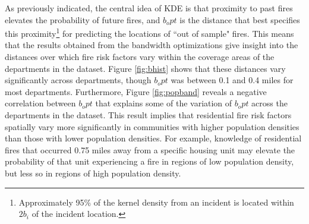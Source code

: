 \documentclass{svjour3}
\begin{document}
 As previously indicated, the central idea of KDE is that proximity to past fires elevates the probability of future fires, and $b_opt$ is the distance that best specifies this proximity\footnote{Approximately 95\% of the kernel density from an incident is located within $2b_i$ of the incident location.} for predicting the locations of ``out of sample" fires. This means that the results obtained from the bandwidth optimizations give insight into the distances over which fire risk factors vary within the coverage areas of the departments in the dataset. Figure \ref{fig:bhist} shows that these distances vary significantly across departments, though $b_opt$ was between 0.1 and 0.4 miles for most departments. Furthermore, Figure \ref{fig:popband} reveals a negative correlation between $b_opt$ that explains some of the variation of $b_opt$ across the departments in the dataset. This result implies that residential fire risk factors spatially vary more significantly in communities with higher population densities than those with lower population densities. For example, knowledge of residential fires that occurred 0.75 miles away from a specific housing unit may elevate the probability of that unit experiencing a fire in regions of low population density, but less so in regions of high population density.
\end{document}
